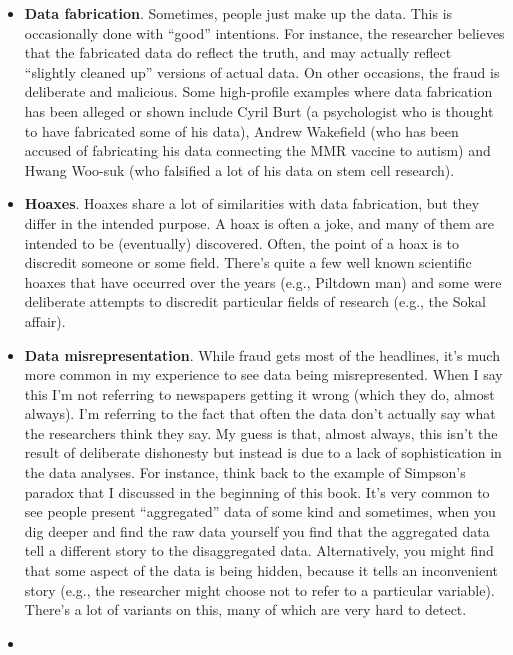 \documentclass[
]{book}
\providecommand{\tightlist}{%
  \setlength{\itemsep}{0pt}\setlength{\parskip}{0pt}}
\begin{document}
\begin{itemize}
\tightlist
\item
  {\textbf{Data fabrication}}. Sometimes, people just make up the data. This is occasionally done with ``good'' intentions. For instance, the researcher believes that the fabricated data do reflect the truth, and may actually reflect ``slightly cleaned up'' versions of actual data. On other occasions, the fraud is deliberate and malicious. Some high-profile examples where data fabrication has been alleged or shown include Cyril Burt (a psychologist who is thought to have fabricated some of his data), Andrew Wakefield (who has been accused of fabricating his data connecting the MMR vaccine to autism) and Hwang Woo-suk (who falsified a lot of his data on stem cell research).\\
\item
  {\textbf{Hoaxes}}. Hoaxes share a lot of similarities with data fabrication, but they differ in the intended purpose. A hoax is often a joke, and many of them are intended to be (eventually) discovered. Often, the point of a hoax is to discredit someone or some field. There's quite a few well known scientific hoaxes that have occurred over the years (e.g., Piltdown man) and some were deliberate attempts to discredit particular fields of research (e.g., the Sokal affair).
\item
  {\textbf{Data misrepresentation}}. While fraud gets most of the headlines, it's much more common in my experience to see data being misrepresented. When I say this I'm not referring to newspapers getting it wrong (which they do, almost always). I'm referring to the fact that often the data don't actually say what the researchers think they say. My guess is that, almost always, this isn't the result of deliberate dishonesty but instead is due to a lack of sophistication in the data analyses. For instance, think back to the example of Simpson's paradox that I discussed in the beginning of this book. It's very common to see people present ``aggregated'' data of some kind and sometimes, when you dig deeper and find the raw data yourself you find that the aggregated data tell a different story to the disaggregated data. Alternatively, you might find that some aspect of the data is being hidden, because it tells an inconvenient story (e.g., the researcher might choose not to refer to a particular variable). There's a lot of variants on this, many of which are very hard to detect.
\item

\end{itemize}
\end{document}
